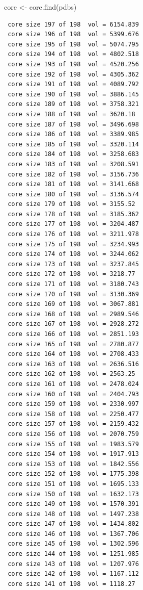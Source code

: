 \documentclass[
  letterpaper,
  DIV=11,
  numbers=noendperiod]{scrartcl}
\newenvironment{Shaded}{\begin{snugshade}}{\end{snugshade}}
\newcommand{\FunctionTok}[1]{\textcolor[rgb]{0.28,0.35,0.67}{#1}}
\newcommand{\NormalTok}[1]{\textcolor[rgb]{0.00,0.23,0.31}{#1}}
\newcommand{\OtherTok}[1]{\textcolor[rgb]{0.00,0.23,0.31}{#1}}
\begin{document}
\begin{Shaded}
\begin{Highlighting}[]
\NormalTok{core }\OtherTok{\textless{}{-}} \FunctionTok{core.find}\NormalTok{(pdbs)}
\end{Highlighting}
\end{Shaded}

\begin{verbatim}
 core size 197 of 198  vol = 6154.839 
 core size 196 of 198  vol = 5399.676 
 core size 195 of 198  vol = 5074.795 
 core size 194 of 198  vol = 4802.518 
 core size 193 of 198  vol = 4520.256 
 core size 192 of 198  vol = 4305.362 
 core size 191 of 198  vol = 4089.792 
 core size 190 of 198  vol = 3886.145 
 core size 189 of 198  vol = 3758.321 
 core size 188 of 198  vol = 3620.18 
 core size 187 of 198  vol = 3496.698 
 core size 186 of 198  vol = 3389.985 
 core size 185 of 198  vol = 3320.114 
 core size 184 of 198  vol = 3258.683 
 core size 183 of 198  vol = 3208.591 
 core size 182 of 198  vol = 3156.736 
 core size 181 of 198  vol = 3141.668 
 core size 180 of 198  vol = 3136.574 
 core size 179 of 198  vol = 3155.52 
 core size 178 of 198  vol = 3185.362 
 core size 177 of 198  vol = 3204.487 
 core size 176 of 198  vol = 3211.978 
 core size 175 of 198  vol = 3234.993 
 core size 174 of 198  vol = 3244.062 
 core size 173 of 198  vol = 3237.845 
 core size 172 of 198  vol = 3218.77 
 core size 171 of 198  vol = 3180.743 
 core size 170 of 198  vol = 3130.369 
 core size 169 of 198  vol = 3067.881 
 core size 168 of 198  vol = 2989.546 
 core size 167 of 198  vol = 2928.272 
 core size 166 of 198  vol = 2851.193 
 core size 165 of 198  vol = 2780.877 
 core size 164 of 198  vol = 2708.433 
 core size 163 of 198  vol = 2636.516 
 core size 162 of 198  vol = 2563.25 
 core size 161 of 198  vol = 2478.024 
 core size 160 of 198  vol = 2404.793 
 core size 159 of 198  vol = 2330.997 
 core size 158 of 198  vol = 2250.477 
 core size 157 of 198  vol = 2159.432 
 core size 156 of 198  vol = 2070.759 
 core size 155 of 198  vol = 1983.579 
 core size 154 of 198  vol = 1917.913 
 core size 153 of 198  vol = 1842.556 
 core size 152 of 198  vol = 1775.398 
 core size 151 of 198  vol = 1695.133 
 core size 150 of 198  vol = 1632.173 
 core size 149 of 198  vol = 1570.391 
 core size 148 of 198  vol = 1497.238 
 core size 147 of 198  vol = 1434.802 
 core size 146 of 198  vol = 1367.706 
 core size 145 of 198  vol = 1302.596 
 core size 144 of 198  vol = 1251.985 
 core size 143 of 198  vol = 1207.976 
 core size 142 of 198  vol = 1167.112 
 core size 141 of 198  vol = 1118.27 

\end{verbatim}
\end{document}
